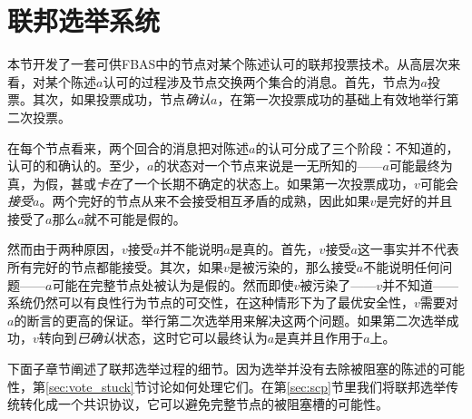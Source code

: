 \section{联邦选举系统}\label{sec:voting}

本节开发了一套可供FBAS中的节点对某个陈述认可的联邦投票技术。从高层次来看，对某个陈述$a$认可的过程涉及节点交换两个集合的消息。首先，节点为$a$投票。其次，如果投票成功，节点\textit{确认}$a$，在第一次投票成功的基础上有效地举行第二次投票。

在每个节点看来，两个回合的消息把对陈述$a$的认可分成了三个阶段：不知道的，认可的和确认的。至少，$a$的状态对一个节点来说是一无所知的——$a$可能最终为真，为假，甚或\textit{卡在}了一个长期不确定的状态上。如果第一次投票成功，$v$可能会\textit{接受}$a$。两个完好的节点从来不会接受相互矛盾的成熟，因此如果$v$是完好的并且接受了$a$那么$a$就不可能是假的。

然而由于两种原因，$v$接受$a$并不能说明$a$是真的。首先，$v$接受$a$这一事实并不代表所有完好的节点都能接受。其次，如果$v$是被污染的，那么接受$a$不能说明任何问题——$a$可能在完整节点处被认为是假的。然而即使$v$被污染了——$v$并不知道——系统仍然可以有良性行为节点的{\quorum}可交性，在这种情形下为了最优安全性，$v$需要对$a$的断言的更高的保证。举行第二次选举用来解决这两个问题。如果第二次选举成功，$v$转向到\textit{已确认}状态，这时它可以最终认为$a$是真并且作用于$a$上。

下面子章节阐述了联邦选举过程的细节。因为选举并没有去除被阻塞的陈述的可能性，第\ref{sec:vote_stuck}节讨论如何处理它们。在第\ref{sec:scp}节里我们将联邦选举传统转化成一个共识协议，它可以避免完整节点的被阻塞槽的可能性。






